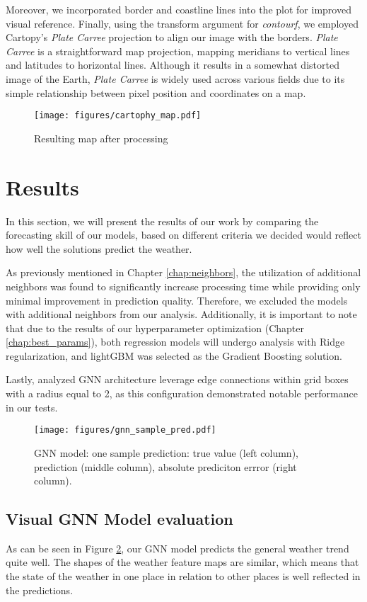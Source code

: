 Moreover, we incorporated border and coastline lines into the plot for improved visual reference. Finally, using the transform argument for \textit{contourf}, we employed Cartopy’s \textit{Plate Carree} projection to align our image with the borders. \textit{Plate Carree} is a straightforward map projection, mapping meridians to vertical lines and latitudes to horizontal lines. Although it results in a somewhat distorted image of the Earth, \textit{Plate Carree} is widely used across various fields due to its simple relationship between pixel position and coordinates on a map.

\begin{figure}[!ht]
    \centering
    \texttt{[image: figures/cartophy\_map.pdf]}
    \caption{Resulting map after processing}
    \label{fig:pretty_map}
\end{figure}

\section{Results} \label{results}
In this section, we will present the results of our work by comparing the forecasting skill of our models, based on different criteria we decided would reflect how well the solutions predict the weather.

As previously mentioned in Chapter \ref{chap:neighbors}, the utilization of additional neighbors was found to significantly increase processing time while providing only minimal improvement in prediction quality. Therefore, we excluded the models with additional neighbors from our analysis. Additionally, it is important to note that due to the results of our hyperparameter optimization (Chapter \ref{chap:best_params}), both regression models will undergo analysis with Ridge regularization, and lightGBM was selected as the Gradient Boosting solution.

Lastly, analyzed GNN architecture leverage edge connections within grid boxes with a radius equal to 2, as this configuration demonstrated notable performance in our tests.

\begin{figure}
    \centering
    \texttt{[image: figures/gnn\_sample\_pred.pdf]}
    \caption{GNN model: one sample prediction: true value (left column), prediction (middle column), absolute prediciton errror (right column).}
    \label{fig:gnn_pred}
\end{figure}

\subsection{Visual GNN Model evaluation}
As can be seen in Figure \ref{fig:gnn_pred}, our GNN model predicts the general weather trend quite well. The shapes of the weather feature maps are similar, which means that the state of the weather in one place in relation to other places is well reflected in the predictions.

